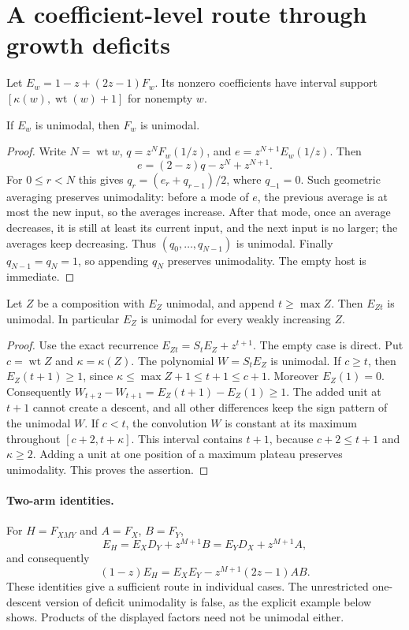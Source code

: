 \section{A coefficient-level route through growth deficits}
Let $E_w=1-z+(2z-1)F_w$. Its nonzero coefficients have interval
support $[\kappa(w),\operatorname{wt}(w)+1]$ for nonempty $w$.

\begin{proposition}
If $E_w$ is unimodal, then $F_w$ is unimodal.
\end{proposition}
\begin{proof}
Write $N=\operatorname{wt}w$, $q=z^NF_w(1/z)$, and
$e=z^{N+1}E_w(1/z)$. Then
\[
 e=(2-z)q-z^N+z^{N+1}.
\]
For $0\le r<N$ this gives $q_r=(e_r+q_{r-1})/2$, where
$q_{-1}=0$. Such geometric averaging preserves unimodality:
before a mode of $e$, the previous average is at most the new input,
so the averages increase. After that mode, once an average decreases,
it is still at least its current input, and the next input is no
larger; the averages keep decreasing. Thus $(q_0,\ldots,q_{N-1})$
is unimodal. Finally $q_{N-1}=q_N=1$, so appending $q_N$ preserves
unimodality. The empty host is immediate.
\end{proof}

\begin{proposition}
Let $Z$ be a composition with $E_Z$ unimodal, and append
$t\ge\max Z$. Then $E_{Zt}$ is unimodal. In particular $E_Z$ is
unimodal for every weakly increasing $Z$.
\end{proposition}
\begin{proof}
Use the exact recurrence $E_{Zt}=S_tE_Z+z^{t+1}$.
The empty case is direct. Put $c=\operatorname{wt}Z$ and
$\kappa=\kappa(Z)$. The polynomial $W=S_tE_Z$ is unimodal.
If $c\ge t$, then $E_Z(t+1)\ge1$, since
$\kappa\le\max Z+1\le t+1\le c+1$. Moreover $E_Z(1)=0$.
Consequently $W_{t+2}-W_{t+1}=E_Z(t+1)-E_Z(1)\ge1$.
The added unit at $t+1$ cannot create a descent, and all other
differences keep the sign pattern of the unimodal $W$.
If $c<t$, the convolution $W$ is constant at its maximum throughout
$[c+2,t+\kappa]$. This interval contains $t+1$, because
$c+2\le t+1$ and $\kappa\ge2$. Adding a unit at one position of a
maximum plateau preserves unimodality. This proves the assertion.
\end{proof}

\paragraph{Two-arm identities.}
For $H=F_{XMY}$ and $A=F_X$, $B=F_Y$,
\[
 E_H=E_XD_Y+z^{M+1}B=E_YD_X+z^{M+1}A,
\]
and consequently
\[
 (1-z)E_H=E_XE_Y-z^{M+1}(2z-1)AB.
\]
These identities give a sufficient route in individual cases. The
unrestricted one-descent version of deficit unimodality is false,
as the explicit example below shows. Products of the displayed
factors need not be unimodal either.

